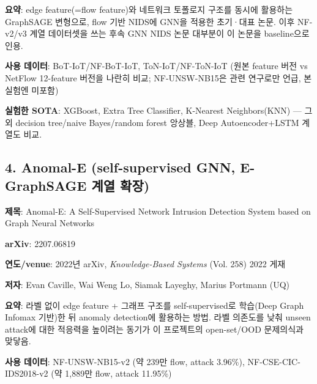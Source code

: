 \par\noindent \textbullet\enspace \textbf{요약}: edge feature(=\allowbreak{}flow feature)와 네트워크 토폴로지 구조를 동시에 활용하는 GraphSAGE 변형으로, flow 기반 NIDS에 GNN을 적용한 초기·대표 논문. 이후 NF-v2/\allowbreak{}v3 계열 데이터셋을 쓰는 후속 GNN NIDS 논문 대부분이 이 논문을 baseline으로 인용.


\par\noindent \textbullet\enspace \textbf{사용 데이터}: BoT-IoT/\allowbreak{}NF-BoT-IoT, ToN-IoT/\allowbreak{}NF-ToN-IoT (원본 feature 버전 vs NetFlow 12-feature 버전을 나란히 비교; NF-UNSW-NB15은 관련 연구로만 언급, 본 실험엔 미포함)


\par\noindent \textbullet\enspace \textbf{실험한 SOTA}: XGBoost, Extra Tree Classifier, K-Nearest Neighbors(KNN) — 그 외 decision tree/\allowbreak{}naive Bayes/\allowbreak{}random forest 앙상블, Deep Autoencoder+\allowbreak{}LSTM 계열도 비교.


\subsection{4. Anomal-E (self-supervised GNN, E-GraphSAGE 계열 확장)}
\par\noindent \textbullet\enspace \textbf{제목}: Anomal-E: A Self-Supervised Network Intrusion Detection System based on Graph Neural Networks


\par\noindent \textbullet\enspace \textbf{arXiv}: 2207.06819


\par\noindent \textbullet\enspace \textbf{연도/\allowbreak{}venue}: 2022년 arXiv, \emph{Knowledge-Based Systems} (Vol. 258) 2022 게재


\par\noindent \textbullet\enspace \textbf{저자}: Evan Caville, Wai Weng Lo, Siamak Layeghy, Marius Portmann (UQ)


\par\noindent \textbullet\enspace \textbf{요약}: 라벨 없이 edge feature +\allowbreak{} 그래프 구조를 self-supervised로 학습(Deep Graph Infomax 기반)한 뒤 anomaly detection에 활용하는 방법. 라벨 의존도를 낮춰 unseen attack에 대한 적응력을 높이려는 동기가 이 프로젝트의 open-set/\allowbreak{}OOD 문제의식과 맞닿음.


\par\noindent \textbullet\enspace \textbf{사용 데이터}: NF-UNSW-NB15-v2 (약 239만 flow, attack 3.96\%), NF-CSE-CIC-IDS2018-v2 (약 1,889만 flow, attack 11.95\%)


